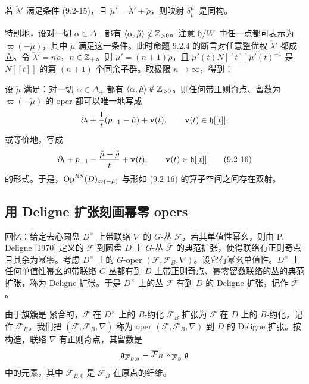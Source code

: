 \begin{proposition}
若 $\check\lambda'$ 满足条件 (9.2-15)，且 $\check\mu'=\check\lambda'+\check\rho$，则映射 $\delta^{\check\mu'}_{\check\mu}$ 是同构。
\end{proposition}

特别地，设对一切 $\alpha\in\Delta_+$ 都有 $\langle\alpha,\check\mu\rangle\notin\mathbb{Z}_{>0}$。注意 $\mathfrak{h}/W$ 中任一点都可表示为 $\varpi(-\check\mu)$，其中 $\check\mu$ 满足这一条件。此时命题 9.2.4 的断言对任意整优权 $\check\lambda'$ 都成立。令 $\check\lambda' = n\check\rho$，$n\in\mathbb{Z}_+$。则 $\check\mu' = (n+1)\check\rho$，且 $\check\mu'(t)N[[t]]\check\mu'(t)^{-1}$ 是 $N[[t]]$ 的第 $(n+1)$ 个同余子群。取极限 $n\to\infty$，得到：

\begin{corollary}
设 $\check\mu$ 满足：对一切 $\alpha\in\Delta_+$ 都有 $\langle\alpha,\check\mu\rangle\notin\mathbb{Z}_{>0}$。则任何带正则奇点、留数为 $\varpi(-\check\mu)$ 的 oper 都可以唯一地写成
\[
\partial_t + \frac{1}{t}(p_{-1}-\check\mu) + \mathbf{v}(t),\qquad \mathbf{v}(t)\in\mathfrak{h}[[t]],
\]
或等价地，写成
\begin{equation}
\partial_t + p_{-1} - \frac{\check\mu+\check\rho}{t} + \mathbf{v}(t),\qquad \mathbf{v}(t)\in\mathfrak{h}[[t]]
\tag{9.2-16}
\end{equation}
的形式。于是，$\operatorname{Op}^{RS}(D)_{\varpi(-\check\mu)}$ 与形如 (9.2-16) 的算子空间之间存在双射。
\end{corollary}

\subsection{用 Deligne 扩张刻画幂零 opers}

回忆：给定去心圆盘 $D^\times$ 上带联络 $\nabla$ 的 $G$-丛 $\mathcal{F}$，若其单值性幂幺，则由 P. Deligne [1970] 定义的 $\mathcal{F}$ 到圆盘 $D$ 上 $G$-丛 $\overline{\mathcal{F}}$ 的典范扩张，使得联络有正则奇点且其余为幂零。考虑 $D^\times$ 上的 $G$-oper $(\mathcal{F},\mathcal{F}_B,\nabla)$。设它有幂幺单值性。$D^\times$ 上任何单值性幂幺的带联络 $G$-丛都有到 $D$ 上带正则奇点、幂零留数联络的丛的典范扩张，称为 Deligne 扩张。于是 $D^\times$ 上的丛 $\mathcal{F}$ 有到 $D$ 的 Deligne 扩张，记作 $\overline{\mathcal{F}}$。

由于旗簇是 紧合的，$\mathcal{F}$ 在 $D^\times$ 上的 $B$-约化 $\mathcal{F}_B$ 扩张为 $\overline{\mathcal{F}}$ 在 $D$ 上的 $B$-约化，记作 $\overline{\mathcal{F}}_B$。我们把 $(\overline{\mathcal{F}},\overline{\mathcal{F}}_B,\nabla)$ 称为 oper $(\mathcal{F},\mathcal{F}_B,\nabla)$ 到 $D$ 的 Deligne 扩张。按构造，联络 $\nabla$ 有正则奇点，其留数是
\[
\mathfrak{g}_{\overline{\mathcal{F}}_{B,0}} = \overline{\mathcal{F}}_B\times_{\overline{\mathcal{F}}_B}\mathfrak{g}
\]
中的元素，其中 $\overline{\mathcal{F}}_{B,0}$ 是 $\overline{\mathcal{F}}_B$ 在原点的纤维。

